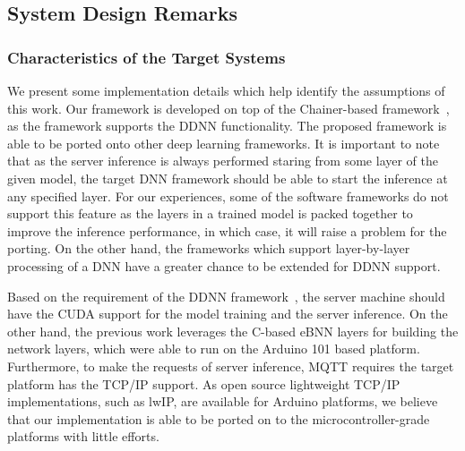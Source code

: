 \documentclass[conference]{IEEEtran}
\begin{document}

\subsection{System Design Remarks}
\label{sec:remarks}

\subsubsection{Characteristics of the Target Systems}
\label{sec:assumptions}
We present some implementation details which help identify the assumptions of this work. Our framework is developed on top of the Chainer-based framework~\cite{Teerapittayanon17}, as the framework supports the DDNN functionality. The proposed framework is able to be ported onto other deep learning frameworks. It is important to note that as the server inference is always performed staring from some layer of the given model, the target DNN framework should be able to start the inference at any specified layer. For our experiences, some of the software frameworks do not support this feature as the layers in a trained model is packed together to improve the inference performance, in which case, it will raise a problem for the porting. On the other hand, the frameworks which support layer-by-layer processing of a DNN have a greater chance to be extended for DDNN support.

Based on the requirement of the DDNN framework~\cite{Teerapittayanon17}, the server machine should have the CUDA support for the model training and the server inference. On the other hand, the previous work leverages the C-based eBNN layers for building the network layers, which were able to run on the Arduino 101 based platform. Furthermore, to make the requests of server inference, MQTT requires the target platform has the TCP/IP support. As open source lightweight TCP/IP implementations, such as lwIP, are available for Arduino platforms, we believe that our implementation is able to be ported on to the microcontroller-grade platforms with little efforts.
\end{document}
